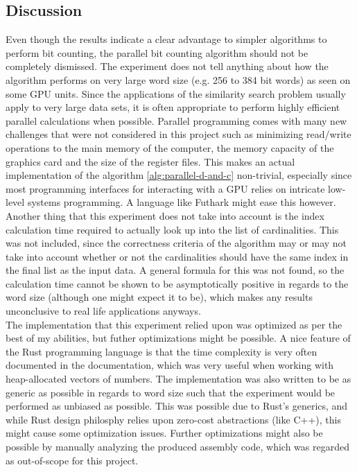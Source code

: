 \subsection{Discussion}
Even though the results indicate a clear advantage to simpler algorithms to perform bit counting, the parallel bit counting algorithm should not be completely dismissed. The experiment does not tell anything about how the algorithm performs on very large word size (e.g. 256 to 384 bit words) as seen on some GPU units\cite{techpowerup}. Since the applications of the similarity search problem usually apply to very large data sets, it is often appropriate to perform highly efficient parallel calculations when possible. Parallel programming comes with many new challenges that were not considered in this project such as minimizing read/write operations to the main memory of the computer, the memory capacity of the graphics card and the size of the register files. This makes an actual implementation of the algorithm \ref{alg:parallel-d-and-c} non-trivial, especially since most programming interfaces for interacting with a GPU relies on intricate low-level systems programming. A language like Futhark might ease this however\cite{futhark}.\\
Another thing that this experiment does not take into account is the index calculation time required to actually look up into the list of cardinalities. This was not included, since the correctness criteria of the algorithm may or may not take into account whether or not the cardinalities should have the same index in the final list as the input data. A general formula for this was not found, so the calculation time cannot be shown to be asymptotically positive in regards to the word size (although one might expect it to be), which makes any results unconclusive to real life applications anyways.\\
The implementation that this experiment relied upon was optimized as per the best of my abilities, but futher optimizations might be possible. A nice feature of the Rust programming language is that the time complexity is very often documented in the documentation, which was very useful when working with heap-allocated vectors of numbers. The implementation was also written to be as generic as possible in regards to word size such that the experiment would be performed as unbiased as possible. This was possible due to Rust's generics, and while Rust design philosphy relies upon zero-cost abstractions\cite{rust-lang} (like C++), this might cause some optimization issues. Further optimizations might also be possible by manually analyzing the produced assembly code, which was regarded as out-of-scope for this project.\\
